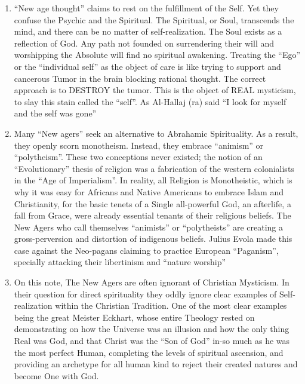 \begin{enumerate}


\item ``New age thought'' claims to rest on the fulfillment of the Self. Yet they confuse the Psychic and the Spiritual. The Spiritual, or Soul, transcends the mind, and there can be no matter of self-realization. The Soul exists as a reflection of God. Any path not founded on surrendering their will and worshipping the Absolute will find no spiritual awakening. Treating the ``Ego'' or the ``individual self'' as the object of care is like trying to support and cancerous Tumor in the brain blocking rational thought. The correct approach is to DESTROY the tumor. This is the object of REAL mysticism, to slay this stain called the ``self''. As Al-Hallaj (ra) said ``I look for myself and the self was gone''

\item Many ``New agers'' seek an alternative to Abrahamic Spirituality. As a result, they openly scorn monotheism. Instead, they embrace ``animism'' or ``polytheism''. These two conceptions never existed; the notion of an ``Evolutionary'' thesis of religion was a fabrication of the western colonialists in the ``Age of Imperialism''. In reality, all Religion is Monotheistic, which is why it was easy for Africans and Native Americans to embrace Islam and Christianity, for the basic tenets of a Single all-powerful God, an afterlife, a fall from Grace, were already essential tenants of their religious beliefs. The New Agers who call themselves ``animists'' or ``polytheists'' are creating a gross-perversion and distortion of indigenous beliefs. Julius Evola made this case against the Neo-pagans claiming to practice European ``Paganism'', specially attacking their libertinism and ``nature worship''

\item On this note, The New Agers are often ignorant of Christian Mysticism. In their question for direct spirituality they oddly ignore clear examples of Self-realization within the Christian Tradition. One of the most clear examples being the great Meister Eckhart, whose entire Theology rested on demonstrating on how the Universe was an illusion and how the only thing Real was God, and that Christ was the ``Son of God'' in-so much as he was the most perfect Human, completing the levels of spiritual ascension, and providing an archetype for all human kind to reject their created natures and become One with God.


\end{enumerate}
